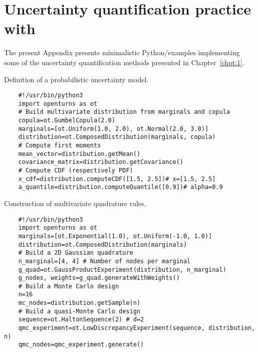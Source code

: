 \cleardoublepage
\chapter{Uncertainty quantification practice with \ot}
\label{apx:D}

The present Appendix presents minimalistic Python/\ot examples implementing some of the uncertainty quantification methods presented in Chapter~\ref{chpt:1}.

\begin{otexample_apx}
    Definition of a probabilistic uncertainty model. 
    \lstset{style=mystyle, language=python}
%
\begin{lstlisting}
    #!/usr/bin/python3
    import openturns as ot
    # Build multivariate distribution from marginals and copula
    copula=ot.GumbelCopula(2.0)
    marginals=[ot.Uniform(1.0, 2.0), ot.Normal(2.0, 3.0)]
    distribution=ot.ComposedDistribution(marginals, copula)
    # Compute first moments
    mean_vector=distribution.getMean()
    covariance_matrix=distribution.getCovariance()
    # Compute CDF (respectively PDF)
    x_cdf=distribution.computeCDF([1.5, 2.5])# x=[1.5, 2.5]
    a_quantile=distribution.computeQuantile([0.9])# alpha=0.9
\end{lstlisting}
%
\end{otexample_apx}

\begin{otexample_apx}
    Construction of multivariate quadrature rules.
%
\lstset{style=mystyle, language=python}
\begin{lstlisting}
    #!/usr/bin/python3
    import openturns as ot
    marginals=[ot.Exponential(1.0), ot.Uniform(-1.0, 1.0)]
    distribution=ot.ComposedDistribution(marginals)
    # Build a 2D Gaussian quadrature
    n_marginal=[4, 4] # Number of nodes per marginal
    g_quad=ot.GaussProductExperiment(distribution, n_marginal)
    g_nodes, weights=g_quad.generateWithWeights()
    # Build a Monte Carlo design
    n=16 
    mc_nodes=distribution.getSample(n)
    # Build a quasi-Monte Carlo design
    sequence=ot.HaltonSequence(2) # d=2
    qmc_experiment=ot.LowDiscrepancyExperiment(sequence, distribution, n)
    qmc_nodes=qmc_experiment.generate()
\end{lstlisting}
%
\end{otexample_apx}


